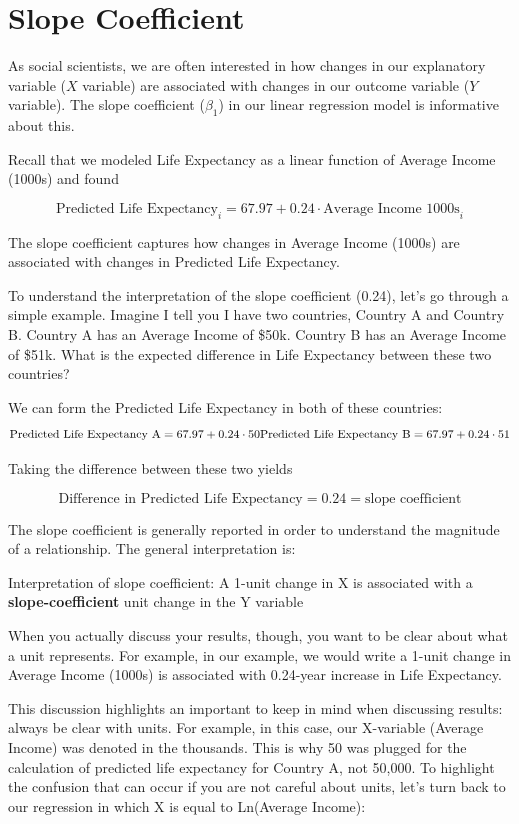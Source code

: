 \documentclass[
]{book}
\begin{document}
\section{Slope Coefficient}\label{slope-coefficient}

As social scientists, we are often interested in how changes in our explanatory variable (\(X\) variable) are associated with changes in our outcome variable (\(Y\) variable). The slope coefficient (\(\beta_1\)) in our linear regression model is informative about this.

Recall that we modeled Life Expectancy as a linear function of Average Income (1000s) and found

\[ 
\text{Predicted Life Expectancy}_i = 67.97 + 0.24 \cdot \text{Average Income 1000s}_i 
\]

The slope coefficient captures how changes in Average Income (1000s) are associated with changes in Predicted Life Expectancy.

To understand the interpretation of the slope coefficient (0.24), let's go through a simple example. Imagine I tell you I have two countries, Country A and Country B. Country A has an Average Income of \$50k. Country B has an Average Income of \$51k. What is the expected difference in Life Expectancy between these two countries?

We can form the Predicted Life Expectancy in both of these countries:
\[
\text{Predicted Life Expectancy A} = 67.97 + 0.24 \cdot 50 \nonumber \\
\text{Predicted Life Expectancy B} = 67.97 + 0.24 \cdot 51 \nonumber
\]

Taking the difference between these two yields

\[
\text{Difference in Predicted Life Expectancy} = 0.24 = \text{slope coefficient} 
\]

The slope coefficient is generally reported in order to understand the magnitude of a relationship. The general interpretation is:

Interpretation of slope coefficient: A 1-unit change in X is associated with a \textbf{slope-coefficient} unit change in the Y variable

When you actually discuss your results, though, you want to be clear about what a unit represents. For example, in our example, we would write a 1-unit change in Average Income (1000s) is associated with 0.24-year increase in Life Expectancy.

This discussion highlights an important to keep in mind when discussing results: always be clear with units. For example, in this case, our X-variable (Average Income) was denoted in the thousands. This is why 50 was plugged for the calculation of predicted life expectancy for Country A, not 50,000. To highlight the confusion that can occur if you are not careful about units, let's turn back to our regression in which X is equal to Ln(Average Income):
\end{document}
